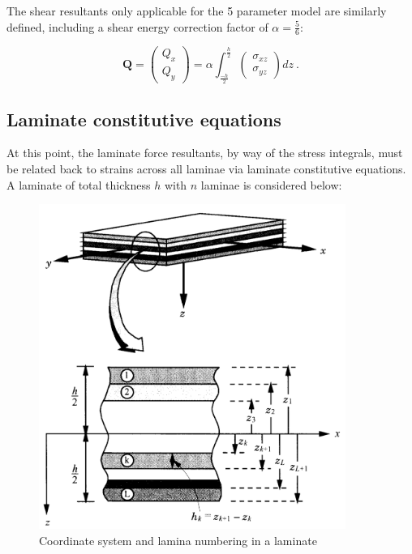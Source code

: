 The shear resultants only applicable for the 5 parameter model are similarly defined, including a shear energy correction factor of $\alpha = \frac{5}{6}$:

\begin{equation} 
\mathbf{Q} = 
\begin{pmatrix}
Q_{x} \\
Q_{y} 
\end{pmatrix}
= \alpha
{\int_{\frac{-h}{2}}^{\frac{h}{2}}
	\begin{pmatrix}
	\sigma_{xz} \\
	\sigma_{yz} 
	\end{pmatrix}}
dz
\label{eqscomp_force_resultants2}\ .
\end{equation}

\subsection{Laminate constitutive equations}

At this point, the laminate force resultants, by way of the stress integrals, must be related back to strains across all laminae via laminate constitutive equations. A laminate of total thickness $h$ with $n$ laminae is considered below:

\begin{figure}[h!]
	\centering
	\includegraphics[width=10cm]{images/composite_layer_system}
	\caption{Coordinate system and lamina numbering in a laminate \cite{reddy2004mechanics}}
	\label{fig:compositelayersystem}
\end{figure}

